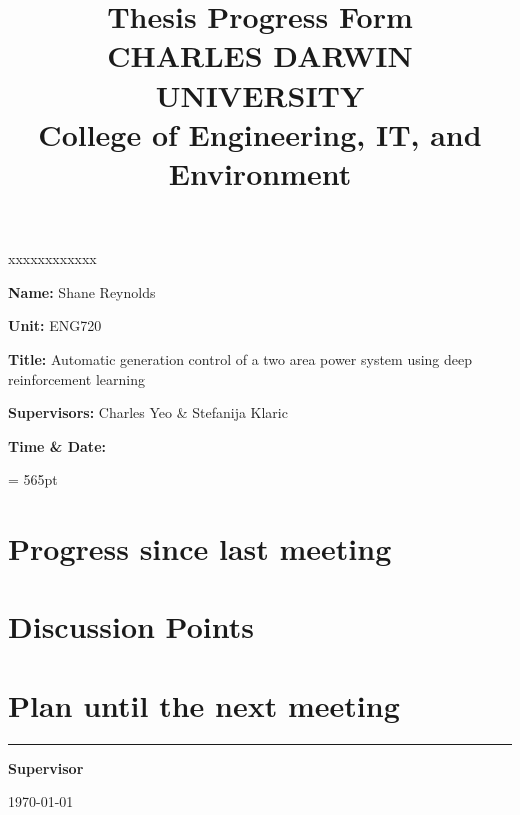 \documentclass[12pt]{article}
\title{	
		Thesis Progress Form\\
		CHARLES DARWIN UNIVERSITY\\
		College of Engineering, IT, and Environment
	  }
\author{}
\date{}
\begin{document}
	
	\maketitle
	
	\begin{namelist}{xxxxxxxxxxxx}
		\item[{\bf Name:}]
			Shane Reynolds
		\item[{\bf Unit:}]
			ENG720
		\item[{\bf Title:}]
			Automatic generation control of a two area power system using deep reinforcement learning
		\item[{\bf Supervisors:}]
			Charles Yeo \& Stefanija Klaric
		\item[{\bf Time \& Date:}]
			
	\end{namelist}
	
	\pagestyle{plain} %
	\textheight = 565pt %
	
	\section{Progress since last meeting}

	\section{Discussion Points}

	\section{Plan until the next meeting}
	
	\par
	\vspace{\fill}%
	\noindent\rule{0.4\linewidth}{0.5pt}%
	\vspace{1em}%
	\par
	\noindent\textbf{Supervisor}\vspace{1em}%
	\par
	\noindent\today
\end{document}
